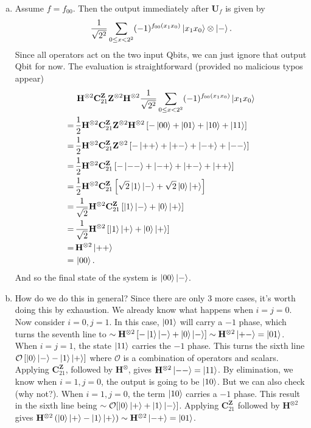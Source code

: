 \documentclass{book}
\theoremstyle{definition}
\newcommand{\nn}{\nonumber}
\newcommand{\f}[2]{\frac{#1}{#2}}
\newcommand{\lp}{\left(}
\newcommand{\rp}{\right)}
\newcommand{\lb}{\left[}
\newcommand{\rb}{\right]}
\newcommand{\U}{\mathbf{U}}
\newcommand{\Z}{\mathbf{Z}}
\newcommand{\had}{\mathbf{H}}
\begin{document}
\begin{enumerate}[(a)]
	
	
	\item Assume $f = f_{00}$. Then the output immediately after $\U_f$ is given by
	\begin{align}
	\f{1}{\sqrt{2^2}}\sum_{0 \leq x < 2^2}(-1)^{f_{00}(x_1x_0)}\ket{x_1x_0} \otimes \ket{ - }.
	\end{align}   
	Since all operators act on the two input Qbits, we can just ignore that output Qbit for now. The evaluation is straightforward (provided no malicious typos appear)
	\begin{align}
	&\,\had^{\otimes 2}\mathbf{C}_{21}^\Z\Z^{\otimes 2}\had^{\otimes 2}\f{1}{\sqrt{2^2}}\sum_{0 \leq x < 2^2}(-1)^{f_{00}(x_1x_0)}\ket{x_1x_0}\nn\\
	=\,& \f{1}{2}\had^{\otimes 2}\mathbf{C}_{21}^\Z \Z^{\otimes 2}\had^{\otimes 2}\lb -\ket{00} + \ket{01} +  \ket{10} + \ket{11} \rb\nn\\
	=\,& \f{1}{2}\had^{\otimes 2}\mathbf{C}_{21}^\Z \Z^{\otimes 2} \lb -\ket{++} + \ket{+-} + \ket{-+} + \ket{--}  \rb\nn\\
	=\,& \f{1}{2}\had^{\otimes 2}\mathbf{C}_{21}^\Z \lb -\ket{--} + \ket{-+} + \ket{+-} + \ket{++} \rb\nn\\
	=\,& \f{1}{2}\had^{\otimes 2}\mathbf{C}_{21}^\Z \lb \sqrt{2}\ket{1}\ket{-} + \sqrt{2}\ket{0} \ket{+} \rb\nn\\
	=\,& \f{1}{\sqrt{2}}\had^{\otimes 2}\mathbf{C}_{21}^\Z\lb \ket{1}\ket{-} + \ket{0} \ket{+} \rb\nn\\
	=\,& \f{1}{\sqrt{2}}\had^{\otimes 2} \lb \ket{1}\ket{+} + \ket{0}\ket{+} \rb\nn\\
	=\,& \had^{\otimes 2}\ket{++}\nn\\
	=\,& \ket{00}.
	\end{align}
	And so the final state of the system is $\ket{00}\ket{ - }$. 
	
	
	
	
	\item How do we do this in general? Since there are only 3 more cases, it's worth doing this by exhaustion. We already know what happens when $i=j=0$. Now consider $i=0, j=1$. In this case, $\ket{01}$ will carry a $-1$ phase, which turns the seventh line to $\sim \had^{\otimes 2} \lb -\ket{1}\ket{-} + \ket{0}\ket{-} \rb \sim \had^{\otimes 2}\ket{+-} = \ket{01}$. When $i=j=1$, the state $\ket{11}$ carries the $-1$ phase. This turns the sixth line $\mathcal{O}\lb \ket{0}\ket{-} - \ket{1}\ket{+} \rb$ where $\mathcal{O}$ is a combination of operators and scalars. Applying $\mathbf{C}_{21}^{\Z}$, followed by $\had^{\otimes}$, gives $\had^{\otimes 2}\ket{--} = \ket{11}$. By elimination, we know when $i=1,j=0$, the output is going to be $\ket{10}$. But we can also check (why not?). When $i=1,j=0$, the term $\ket{10}$ carries a $-1$ phase. This result in the sixth line being $\sim \mathcal{O}[\ket{0}\ket{+} + \ket{1}\ket{-}]$. Applying $\mathbf{C}_{21}^{\Z}$ followed by $\had^{\otimes 2}$ gives $\had^{\otimes 2} \lp \ket{0}\ket{+} - \ket{1}\ket{+} \rp \sim \had^{\otimes 2}\ket{-+} = \ket{01}$. \\
	

\end{enumerate}
\end{document}
